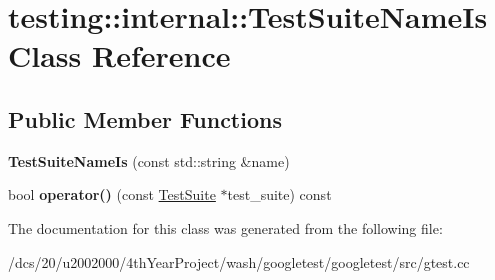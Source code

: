 \hypertarget{classtesting_1_1internal_1_1TestSuiteNameIs}{}\section{testing\+:\+:internal\+:\+:Test\+Suite\+Name\+Is Class Reference}
\label{classtesting_1_1internal_1_1TestSuiteNameIs}
\subsection*{Public Member Functions}
\begin{DoxyCompactItemize}
\item 
\mbox{\label{classtesting_1_1internal_1_1TestSuiteNameIs_a7d65a4c117c222adb5512fe09329964f}} 
{\bfseries Test\+Suite\+Name\+Is} (const std\+::string \&name)
\item 
\mbox{\label{classtesting_1_1internal_1_1TestSuiteNameIs_a28ea67af3de2c5baf0fb70bfdd0784c6}} 
bool {\bfseries operator()} (const \mbox{\hyperlink{classtesting_1_1TestSuite}{Test\+Suite}} $\ast$test\+\_\+suite) const
\end{DoxyCompactItemize}


The documentation for this class was generated from the following file\+:\begin{DoxyCompactItemize}
\item 
/dcs/20/u2002000/4th\+Year\+Project/wash/googletest/googletest/src/gtest.\+cc\end{DoxyCompactItemize}
